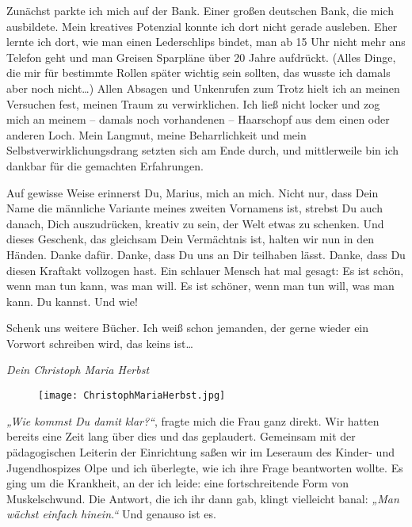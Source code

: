 \documentclass[fontsize=12pt,a4paper,headinclude,DIV=calc,automark]{scrbook}
\begin{document}
Zunächst parkte ich mich auf der Bank. Einer großen deutschen Bank, die mich ausbildete. Mein kreatives Potenzial konnte ich dort nicht gerade ausleben. Eher lernte ich dort, wie man einen Lederschlips bindet, man ab 15 Uhr nicht mehr ans Telefon geht und man Greisen Sparpläne über 20 Jahre aufdrückt. (Alles Dinge, die mir für bestimmte Rollen später wichtig sein sollten, das wusste ich damals aber noch nicht…)
Allen Absagen und Unkenrufen zum Trotz hielt ich an meinen Versuchen fest, meinen Traum zu verwirklichen.
Ich ließ nicht locker und zog mich an meinem – damals noch vorhandenen – Haarschopf aus dem einen oder anderen Loch.
Mein Langmut, meine Beharrlichkeit und mein Selbstverwirklichungsdrang setzten sich am Ende durch, und mittlerweile bin ich dankbar für die gemachten Erfahrungen.

Auf gewisse Weise erinnerst Du, Marius, mich an mich. Nicht nur, dass Dein Name die männliche Variante meines zweiten Vornamens ist, strebst Du auch danach, Dich auszudrücken, kreativ zu sein, der Welt etwas zu schenken. Und dieses Geschenk, das gleichsam Dein Vermächtnis ist, halten wir nun in den Händen.
Danke dafür. Danke, dass Du uns an Dir teilhaben lässt. Danke, dass Du diesen Kraftakt vollzogen hast.
Ein schlauer Mensch hat mal gesagt: Es ist schön, wenn man tun kann, was man will. Es ist schöner, wenn man tun will, was man kann.
Du kannst. Und wie!

Schenk uns weitere Bücher. Ich weiß schon jemanden, der gerne wieder ein Vorwort schreiben wird, das keins ist…

\vspace{0.5cm}
\noindent\textit{Dein Christoph Maria Herbst}

\begin{figure}[ht] %
    \centering %
    \texttt{[image: ChristophMariaHerbst.jpg]}
    \label{fig:ChristophMariaHerbst} %
\end{figure}


\textit{„Wie kommst Du damit klar?“}, fragte mich die Frau ganz direkt. Wir hatten bereits eine Zeit lang über dies und das geplaudert. Gemeinsam mit der pädagogischen Leiterin der Einrichtung saßen wir im Leseraum des Kinder- und Jugendhospizes Olpe und ich überlegte, wie ich ihre Frage beantworten wollte. Es ging um die Krankheit, an der ich leide: eine fortschreitende Form von Muskelschwund. Die Antwort, die ich ihr dann gab, klingt vielleicht banal: \textit{„Man wächst einfach hinein.“} Und genauso ist es.
\end{document}
